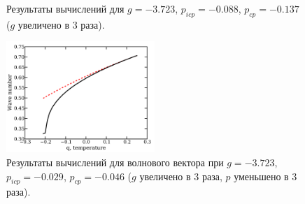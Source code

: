 \begin{figure}[p]\label{fig:gx3}
\centering
{}
\newline
{}
\newline
\caption{Результаты вычислений для $g= -3.723$, $p_{icp}= -0.088$, $p_{cp}=-0.137$ ($g$ увеличено в 3 раза).}
\end{figure}

\begin{figure}\label{fig:gx3p_3-wn}
\includegraphics[width = 0.5\textwidth]{figs/gx3p_3-wn.pdf}
\caption{Результаты вычислений для волнового вектора при $g= -3.723$, $p_{icp}= -0.029$, $p_{cp}=-0.046$ ($g$ увеличено в 3 раза, $p$ уменьшено в 3 раза).}
\end{figure}

